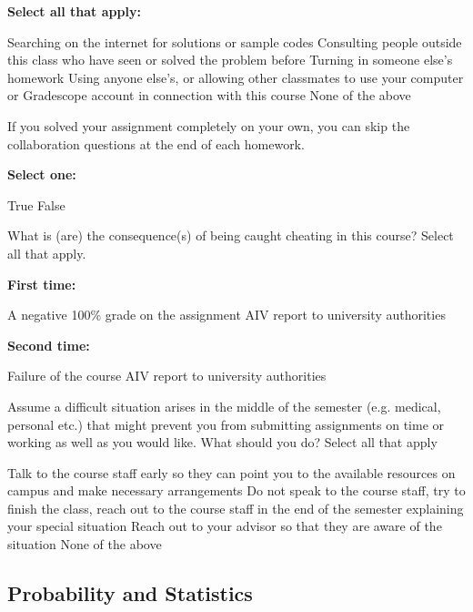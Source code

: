 \documentclass[11pt,addpoints,answers]{exam}
\numberwithin{equation}{section} %
\numberwithin{figure}{section} %
\numberwithin{table}{section} %
\begin{document}
\begin{questions}
    \textbf{Select all that apply:}
        {%
    \checkboxchar{$\Box$} \checkedchar{$\blacksquare$}
    \begin{checkboxes}

        \choice Searching on the internet for solutions or sample codes
        \choice Consulting people outside this class who have seen or solved the problem before
        \choice Turning in someone else's homework
        \choice Using anyone else's, or allowing other classmates to use your computer or Gradescope account in connection with this course
        \choice None of the above
        
    \end{checkboxes}
    }

    
    \question[1] If you solved your assignment completely on your own, you can skip the collaboration questions at the end of each homework.
    
    \textbf{Select one:}
    \begin{checkboxes}
        \choice True
        \choice False
    \end{checkboxes}

    
    \question[1] What is (are) the consequence(s) of being caught cheating in this course? Select all that apply.
    
    \textbf{First time:}
    {%
    \begin{checkboxes}
        
    \checkboxchar{$\Box$} \checkedchar{$\blacksquare$}
        \choice A negative 100\% grade on the assignment
        \choice AIV report to university authorities
    \end{checkboxes}
    }
    

    
    \textbf{Second time:}
    {%
    \begin{checkboxes}
    \checkboxchar{$\Box$} \checkedchar{$\blacksquare$}
        \choice Failure of the course
        \choice AIV report to university authorities
    \end{checkboxes}
    }

    
\question[1] Assume a difficult situation arises in the middle of the semester (e.g. medical, personal etc.) that might prevent you from submitting assignments on time or working as well as you would like. What should you do? Select all that apply
\begin{checkboxes}
    \checkboxchar{$\Box$} \checkedchar{$\blacksquare$}

\choice Talk to the course staff early so they can point you to the available resources on campus and make necessary arrangements
\choice Do not speak to the course staff, try to finish the class, reach out to the course staff in the end of the semester explaining your special situation
\choice Reach out to your advisor so that they are aware of the situation
\choice None of the above
\end{checkboxes}   


\end{questions}
\clearpage\subsection{Probability and Statistics}
\end{document}
